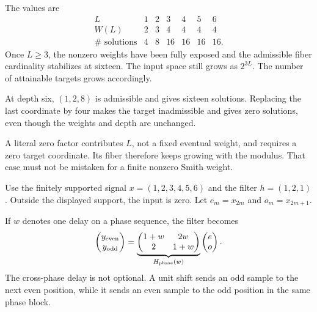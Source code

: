 
The values are
\[
\begin{array}{c|rrrrrr}
L&1&2&3&4&5&6\\\hline
W(L)&2&3&4&4&4&4\\
\#\text{ solutions}&4&8&16&16&16&16.
\end{array}
\]
Once $L\ge3$, the nonzero weights have been fully exposed and the admissible fiber cardinality stabilizes at sixteen. The input space still grows as $2^{3L}$. The number of attainable targets grows accordingly.

At depth six, $(1,2,8)$ is admissible and gives sixteen solutions. Replacing the last coordinate by four makes the target inadmissible and gives zero solutions, even though the weights and depth are unchanged.

A literal zero factor contributes $L$, not a fixed eventual weight, and requires a zero target coordinate. Its fiber therefore keeps growing with the modulus. That case must not be mistaken for a finite nonzero Smith weight.


Use the finitely supported signal $x=(1,2,3,4,5,6)$ and the filter $h=(1,2,1)$. Outside the displayed support, the input is zero. Let $e_m=x_{2m}$ and $o_m=x_{2m+1}$.


If $w$ denotes one delay on a phase sequence, the filter becomes
\[
\begin{pmatrix}y_{\rm even}\\y_{\rm odd}\end{pmatrix}
=
\underbrace{\begin{pmatrix}1+w&2w\\2&1+w\end{pmatrix}}_{H_{\rm phase}(w)}
\begin{pmatrix}e\\o\end{pmatrix}.
\]
The cross-phase delay is not optional. A unit shift sends an odd sample to the next even position, while it sends an even sample to the odd position in the same phase block.

